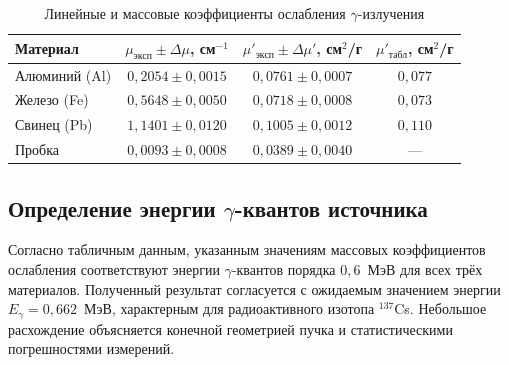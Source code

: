 \documentclass[12pt,a4paper]{article}
\begin{document}
\begin{table}[h!]
\centering
\caption{Линейные и массовые коэффициенты ослабления $\gamma$-излучения}
\label{tab:mu_results}
\renewcommand{\arraystretch}{1.3}
\begin{tabular}{|l|c|c|c|}
\hline
\textbf{Материал} & \textbf{$\mu_{\text{эксп}} \pm \Delta \mu$, см$^{-1}$} & \textbf{$\mu'_{\text{эксп}} \pm \Delta \mu'$, см$^2$/г} & \textbf{$\mu'_{\text{табл}}$, см$^2$/г} \\
\hline
Алюминий (Al) & $0{,}2054 \pm 0{,}0015$ & $0{,}0761 \pm 0{,}0007$ & $0{,}077$ \\
\hline
Железо (Fe)   & $0{,}5648 \pm 0{,}0050$ & $0{,}0718 \pm 0{,}0008$ & $0{,}073$ \\
\hline
Свинец (Pb)   & $1{,}1401 \pm 0{,}0120$ & $0{,}1005 \pm 0{,}0012$ & $0{,}110$ \\
\hline
Пробка        & $0{,}0093 \pm 0{,}0008$ & $0{,}0389 \pm 0{,}0040$ & --- \\
\hline
\end{tabular}
\end{table}











\subsection*{Определение энергии $\gamma$-квантов источника}



Согласно табличным данным, указанным значениям массовых коэффициентов ослабления соответствуют энергии $\gamma$-квантов порядка $0{,}6$~МэВ для всех трёх материалов. Полученный результат согласуется с ожидаемым значением энергии $E_\gamma = 0{,}662$~МэВ, характерным для радиоактивного изотопа $^{137}$Cs. Небольшое расхождение объясняется конечной геометрией пучка и статистическими погрешностями измерений.
\end{document}

